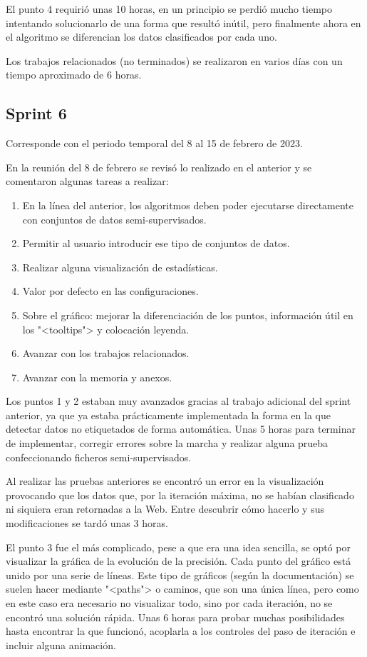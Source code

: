 El punto 4 requirió unas 10 horas, en un principio se perdió mucho tiempo
intentando solucionarlo de una forma que resultó inútil, pero finalmente ahora en
el algoritmo se diferencian los datos clasificados por cada uno.

Los trabajos relacionados (no terminados) se realizaron en varios días con un
tiempo aproximado de 6 horas.

\subsection{Sprint 6}
Corresponde con el periodo temporal del 8 al 15 de febrero de 2023.

En la reunión del 8 de febrero se revisó lo realizado en el anterior y se
comentaron algunas tareas a realizar:
\begin{enumerate}
    \item En la línea del anterior, los algoritmos deben poder ejecutarse
    directamente con conjuntos de datos semi-supervisados.
    \item Permitir al usuario introducir ese tipo de conjuntos de datos.
    \item Realizar alguna visualización de estadísticas.
    \item Valor por defecto en las configuraciones.
    \item Sobre el gráfico: mejorar la diferenciación de los puntos, información
    útil en los "<tooltips"> y colocación leyenda.
    \item Avanzar con los trabajos relacionados.
    \item Avanzar con la memoria y anexos.
\end{enumerate}

Los puntos 1 y 2 estaban muy avanzados gracias al trabajo adicional del sprint
anterior, ya que ya estaba prácticamente implementada la forma en la que
detectar datos no etiquetados de forma automática. Unas 5 horas para terminar de
implementar, corregir errores sobre la marcha y realizar alguna prueba
confeccionando ficheros semi-supervisados.

Al realizar las pruebas anteriores se encontró un error en la visualización
provocando que los datos que, por la iteración máxima, no se habían clasificado
ni siquiera eran retornadas a la Web. Entre descubrir cómo hacerlo y sus
modificaciones se tardó unas 3 horas.

El punto 3 fue el más complicado, pese a que era una idea sencilla, se optó por
visualizar la gráfica de la evolución de la precisión. Cada punto del gráfico
está unido por una serie de líneas. Este tipo de gráficos (según la
documentación) se suelen hacer mediante "<paths"> o caminos, que son una única
línea, pero como en este caso era necesario no visualizar todo, sino por cada
iteración, no se encontró una solución rápida. Unas 6 horas para probar muchas
posibilidades hasta encontrar la que funcionó, acoplarla a los controles del
paso de iteración e incluir alguna animación.

